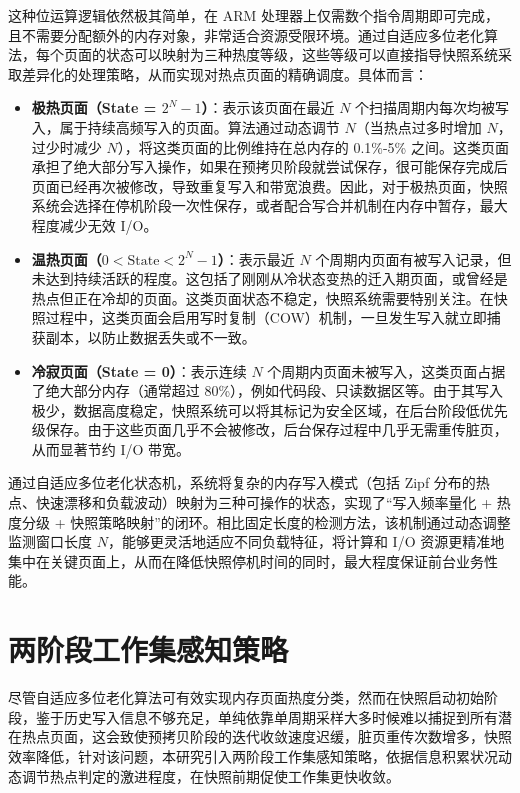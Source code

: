 这种位运算逻辑依然极其简单，在 ARM 处理器上仅需数个指令周期即可完成，且不需要分配额外的内存对象，非常适合资源受限环境。通过自适应多位老化算法，每个页面的状态可以映射为三种热度等级，这些等级可以直接指导快照系统采取差异化的处理策略，从而实现对热点页面的精确调度。具体而言：
\begin{itemize}\item 
    \textbf{极热页面（State = $2^N - 1$）}：表示该页面在最近 $N$ 个扫描周期内每次均被写入，属于持续高频写入的页面。算法通过动态调节 $N$（当热点过多时增加 $N$，过少时减少 $N$），将这类页面的比例维持在总内存的 0.1\%-5\% 之间。这类页面承担了绝大部分写入操作，如果在预拷贝阶段就尝试保存，很可能保存完成后页面已经再次被修改，导致重复写入和带宽浪费。因此，对于极热页面，快照系统会选择在停机阶段一次性保存，或者配合写合并机制在内存中暂存，最大程度减少无效 I/O。
    
    \item \textbf{温热页面（$0 < \text{State} < 2^N - 1$）}：表示最近 $N$ 个周期内页面有被写入记录，但未达到持续活跃的程度。这包括了刚刚从冷状态变热的迁入期页面，或曾经是热点但正在冷却的页面。这类页面状态不稳定，快照系统需要特别关注。在快照过程中，这类页面会启用写时复制（COW）机制，一旦发生写入就立即捕获副本，以防止数据丢失或不一致。
    
    \item \textbf{冷寂页面（State = 0）}：表示连续 $N$ 个周期内页面未被写入，这类页面占据了绝大部分内存（通常超过 80\%），例如代码段、只读数据区等。由于其写入极少，数据高度稳定，快照系统可以将其标记为安全区域，在后台阶段低优先级保存。由于这些页面几乎不会被修改，后台保存过程中几乎无需重传脏页，从而显著节约 I/O 带宽。\end{itemize}通过自适应多位老化状态机，系统将复杂的内存写入模式（包括 Zipf 分布的热点、快速漂移和负载波动）映射为三种可操作的状态，实现了“写入频率量化 + 热度分级 + 快照策略映射”的闭环。相比固定长度的检测方法，该机制通过动态调整监测窗口长度 $N$，能够更灵活地适应不同负载特征，将计算和 I/O 资源更精准地集中在关键页面上，从而在降低快照停机时间的同时，最大程度保证前台业务性能。

\section{两阶段工作集感知策略}

尽管自适应多位老化算法可有效实现内存页面热度分类，然而在快照启动初始阶段，鉴于历史写入信息不够充足，单纯依靠单周期采样大多时候难以捕捉到所有潜在热点页面，这会致使预拷贝阶段的迭代收敛速度迟缓，脏页重传次数增多，快照效率降低，针对该问题，本研究引入两阶段工作集感知策略，依据信息积累状况动态调节热点判定的激进程度，在快照前期促使工作集更快收敛。

